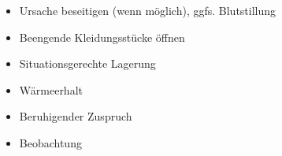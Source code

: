 %
\label{m:ehi-schockbekaempfung}
\begin{itemize}
  \item Ursache beseitigen (wenn möglich), ggfs. Blutstillung
  \item Beengende Kleidungsstücke öffnen
  \item Situationsgerechte Lagerung
  \item Wärmeerhalt
  \item Beruhigender Zuspruch
  \item Beobachtung
\end{itemize}